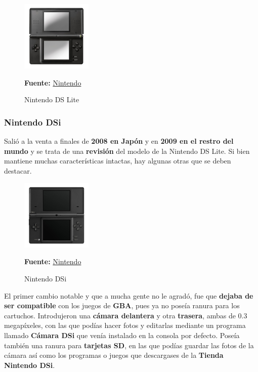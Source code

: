 \begin{figure}[htbp]
\centering
  \includegraphics[width=0.3\textwidth]{archivos/ndslite.jpg}
  \caption{Nintendo DS Lite}
    \textbf{Fuente:} \href{https://www.nintendo.co.uk/Nintendo-DS/Nintendo-DS-Family-Nintendo-UK-s-official-site-Nintendo-DS-Nintendo-DSi-Nintendo-DSi-XL-116380.html}{Nintendo}
  \label{fig:ndslite}
\end{figure}

\vspace{1cm}

\subsubsection{Nintendo DSi}

Salió a la venta a finales de \textbf{2008 en Japón} y en \textbf{2009 en el restro del mundo} y se trata de una \textbf{revisión} del modelo de la Nintendo DS Lite. Si bien mantiene muchas características intactas, hay algunas otras que se deben destacar.

\vspace{0.5cm}

\begin{figure}[htbp]
\centering
  \includegraphics[width=0.3\textwidth]{archivos/ndsi.jpg}
  \caption{Nintendo DSi}
    \textbf{Fuente:} \href{https://www.nintendo.co.uk/Nintendo-DS/Nintendo-DS-Family-Nintendo-UK-s-official-site-Nintendo-DS-Nintendo-DSi-Nintendo-DSi-XL-116380.html}{Nintendo}
  \label{fig:ndsi}
\end{figure}

\vspace{0.5cm}

El primer cambio notable y que a mucha gente no le agradó, fue que \textbf{dejaba de ser compatible} con los juegos de \textbf{GBA}, pues ya no poseía ranura para los cartuchos. Introdujeron una \textbf{cámara delantera} y otra \textbf{trasera}, ambas de 0.3 megapíxeles, con las que podías hacer fotos y editarlas mediante un programa llamado \textbf{Cámara DSi} que venía instalado en la consola por defecto.  Poseía también una ranura para \textbf{tarjetas SD}, en las que podías guardar las fotos de la cámara así como los programas o juegos que descargases de la \textbf{Tienda Nintendo DSi}.

